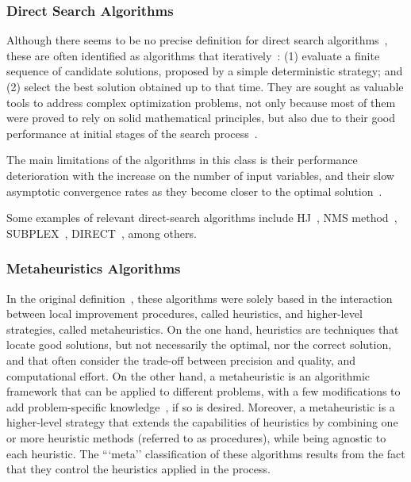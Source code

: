 	\subsubsection{Direct Search Algorithms}
	\label{ssec:direct-search}
	
	Although there seems to be no precise definition for direct search algorithms~\cite{Kolda2003}, these are often identified as algorithms that iteratively~\cite{Kolda2003,Wortmann2016BBO}: (1) evaluate a finite sequence of candidate solutions, proposed by a simple deterministic strategy; and (2) select the best solution obtained up to that time. They are sought as valuable tools to address complex optimization problems, not only because most of them were proved to rely on solid mathematical principles, but also due to their good performance at initial stages of the search process~\cite{Rios2013, Wortmann2016BBO}. 
	
	The main limitations of the algorithms in this class is their performance deterioration with the increase on the number of input variables, and their slow asymptotic convergence rates as they become closer to the optimal solution~\cite{Kolda2003}.
	
	Some examples of relevant direct-search algorithms include \ac{HJ}~\cite{Hooke1961}, \ac{NMS} method~\cite{Nelder1964}, SUBPLEX~\cite{Rowan1990}, \ac{DIRECT}~\cite{Jones1993DIRECT}, among others.
	
	\subsubsection{Metaheuristics Algorithms}
	\label{ssec:metaheuristics}
	
	In the original definition~\cite{Glover2003Metaheuristics}, these algorithms were solely based in the interaction between local improvement procedures, called heuristics, and higher-level strategies, called metaheuristics. On the one hand, heuristics are techniques that locate good solutions, but not necessarily the optimal, nor the correct solution, and that often consider the trade-off between precision and quality, and computational effort. On the other hand, a metaheuristic is an algorithmic framework that can be applied to different problems, with a few modifications to add problem-specific knowledge~\cite{Glover2003Metaheuristics}, if so is desired. Moreover, a metaheuristic is a higher-level strategy that extends the capabilities of heuristics by combining one or more heuristic methods (referred to as procedures), while being agnostic to each heuristic. The ```meta'' classification of these algorithms results from the fact that they control the heuristics applied in the process.
	
